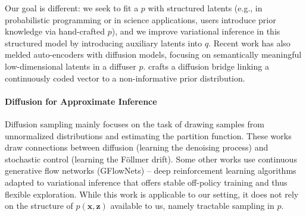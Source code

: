 \documentclass[letterpaper]{article} %
\newcommand{\bx}{\mathbf{x}}
\newcommand{\bz}{\mathbf{z}}
\newcommand{\by}{\mathbf{y}}
\let\oldphi\phi
\renewcommand{\phi}{{\boldsymbol \oldphi}}
\begin{document}
{Our goal is different}: we seek to fit a $p$ with structured latents (e.g., in probabilistic programming or in science applications, users introduce prior knowledge via hand-crafted $p$), and we improve variational inference in this structured model by introducing auxiliary latents into $q$.
Recent work \citep{preechakul2022diffusion, zhang2022unsupervised, wang2023infodiffusion} has also melded auto-encoders with diffusion models, focusing on semantically meaningful low-dimensional latents in a diffuser $p$. 
\citet{cohen2022diffusion} crafts a diffusion bridge linking a continuously coded vector to a non-informative prior distribution.
\paragraph{Diffusion for Approximate Inference}

Diffusion sampling \cite{berner2022optimal, zhang2021path, vargas2023denoising, zhang2023diffusion, richter2023improved, sendera2024diffusion, akhound2024iterated} mainly focuses on 
the task of drawing samples from unnormalized distributions and estimating the partition function. 
These works draw connections between diffusion (learning the denoising process) and stochastic control (learning the Föllmer drift).
Some other works \cite{zhang2023diffusion, akhound2024iterated, sendera2024diffusion} use continuous generative flow networks (GFlowNets) – deep reinforcement learning algorithms adapted to variational inference that offers stable off-policy training and thus flexible exploration. 
While this work is applicable to our setting, it does not rely on the structure of $p(\bx,\bz)$ available to us, namely tractable sampling in $p$.
\end{document}
